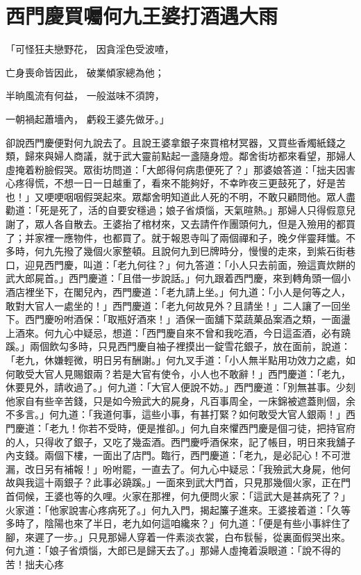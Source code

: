 %

\chapter{西門慶買囑何九\KG 王婆打酒遇大雨}

「可怪狂夫戀野花，  因貪淫色受波喳，

亡身喪命皆因此，  破業傾家總為他；

半晌風流有何益，  一般滋味不須誇，

一朝禍起蕭墻內，  虧殺王婆先做牙。」

卻說西門慶便對何九說去了。且說王婆拿銀子來買棺材冥器，又買些香燭紙錢之類，歸來與婦人商議，就于武大靈前點起一盞隨身燈。鄰舍街坊都來看望，那婦人虛掩着粉臉假哭。眾街坊問道：「大郎得何病患便死了？」那婆娘答道：「拙夫因害心疼得慌，不想一日一日越重了，看來不能夠好，不幸昨夜三更鼓死了，好是苦也！」又哽哽咽咽假哭起來。眾鄰舍明知道此人死的不明，不敢只顧問他。眾人盡勸道：「死是死了，活的自要安穩過；娘子省煩惱，天氣暄熱。」那婦人只得假意兒謝了，眾人各自散去。王婆抬了棺材來，又去請仵作團頭何九，但是入殮用的都買了；并家裡一應物件，也都買了。就于報恩寺叫了兩個禪和子，晚夕伴靈拜懺。不多時，何九先撥了幾個火家整頓。且說何九到巳牌時分，慢慢的走來，到紫石街巷口，迎見西門慶，叫道：「老九何往？」何九答道：「小人只去前面，殮這賣炊餅的武大郎屍首。」西門慶道：「且借一步說話。」何九跟着西門慶，來到轉角頭一個小酒店裡坐下，在閣兒內，西門慶道：「老九請上坐。」何九道：「小人是何等之人，敢對大官人一處坐的！」西門慶道：「老九何故見外？且請坐！」二人讓了一回坐下。西門慶吩咐酒保：「取瓶好酒來！」酒保一面舖下菜蔬菓品案酒之類，一面盪上酒來。何九心中疑忌，想道：「西門慶自來不曾和我吃酒，今日這盃酒，必有蹺蹊。」兩個飲勾多時，只見西門慶自袖子裡摸出一錠雪花銀子，放在面前，說道：「老九，休嫌輕微，明日另有酬謝。」何九叉手道：「小人無半點用功效力之處，如何敢受大官人見賜銀兩？若是大官有使令，小人也不敢辭！」西門慶道：「老九，休要見外，請收過了。」何九道：「大官人便說不妨。」西門慶道：「別無甚事。少刻他家自有些辛苦錢，只是如今殮武大的屍身，凡百事周全，一床錦被遮蓋則個，余不多言。」何九道：「我道何事，這些小事，有甚打緊？如何敢受大官人銀兩！」西門慶道：「老九！你若不受時，便是推卻。」何九自來懼西門慶是個刁徒，把持官府的人，只得收了銀子，又吃了幾盃酒。西門慶呼酒保來，記了帳目，明日來我舖子內支錢。兩個下樓，一面出了店門。臨行，西門慶道：「老九，是必記心！不可泄漏，改日另有補報！」吩咐罷，一直去了。何九心中疑忌：「我殮武大身屍，他何故與我這十兩銀子？此事必蹺蹊。」一面來到武大門首，只見那幾個火家，正在門首伺候，王婆也等的久哩。火家在那裡，何九便問火家：「這武大是甚病死了？」火家道：「他家說害心疼病死了。」何九入門，揭起簾子進來。王婆接着道：「久等多時了，陰陽也來了半日，老九如何這咱纔來？」何九道：「便是有些小事絆住了腳，來遲了一步。」只見那婦人穿着一件素淡衣裳，白布䯼髻，從裏面假哭出來。何九道：「娘子省煩惱，大郎已是歸天去了。」那婦人虛掩着淚眼道：「說不得的苦！拙夫心疼